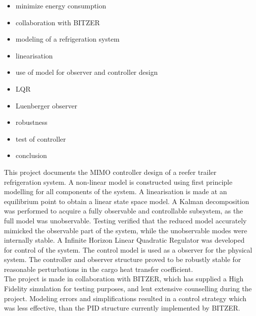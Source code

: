 \begin{itemize}
	\item minimize energy consumption
	\item collaboration with BITZER
	\item modeling of a refrigeration system
	\item linearisation
	\item use of model for observer and controller design
	\item LQR
	\item Luenberger observer
	\item robustness
	\item test of controller
	\item conclusion
\end{itemize}

This project documents the MIMO controller design of a reefer trailer refrigeration system. A non-linear model is constructed using first principle modelling for all components of the system. A linearisation is made at an equilibrium point to obtain a linear state space model. A Kalman decomposition was performed to acquire a fully observable and controllable subsystem, as the full model was unobservable. Testing verified that the reduced model accurately mimicked the observable part of the system, while the unobservable modes were internally stable. A Infinite Horizon Linear Quadratic Regulator was developed for control of the system. The control model is used as a observer for the physical system. The controller and observer structure proved to be robustly stable for reasonable perturbations in the cargo heat transfer coefficient.\\

The project is made in collaboration with BITZER, which has supplied a High Fidelity simulation for testing purposes, and lent extensive counselling during the project. Modeling errors and simplifications resulted in a control strategy which was less effective, than the PID structure currently implemented by BITZER.